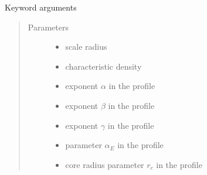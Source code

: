 \documentclass[letterpaper,10pt,english]{sphinxmanual}
\begin{document}
\begin{fulllineitems}
\begin{quote}
\begin{description}
\begin{itemize}
\end{itemize}

\end{description}\end{quote}

\sphinxAtStartPar
Keyword arguments
\begin{quote}\begin{description}
\item[{Parameters}] \leavevmode\begin{itemize}
\item {} 
\sphinxAtStartPar
{} \textendash{} scale radius

\item {} 
\sphinxAtStartPar
{} \textendash{} characteristic density

\item {} 
\sphinxAtStartPar
{} \textendash{} exponent \(\alpha\) in the {\hyperref[\detokenize{diffsph.profiles:diffsph.profiles.templates.hdz}]{}} profile

\item {} 
\sphinxAtStartPar
{} \textendash{} exponent \(\beta\) in the {\hyperref[\detokenize{diffsph.profiles:diffsph.profiles.templates.hdz}]{}} profile

\item {} 
\sphinxAtStartPar
{} \textendash{} exponent \(\gamma\) in the {\hyperref[\detokenize{diffsph.profiles:diffsph.profiles.templates.hdz}]{}} profile

\item {} 
\sphinxAtStartPar
{} \textendash{} parameter \(\alpha_E\) in the {\hyperref[\detokenize{diffsph.profiles:diffsph.profiles.templates.enst}]{}} profile

\item {} 
\sphinxAtStartPar
{} \textendash{} core radius parameter \(r_c\) in the {\hyperref[\detokenize{diffsph.profiles:diffsph.profiles.templates.cnfw}]{}} profile


\end{itemize}
\end{description}
\end{quote}
\end{fulllineitems}
\end{document}
